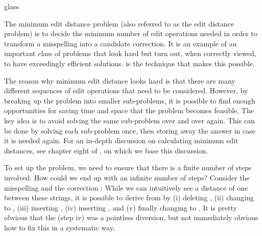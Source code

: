 
\begin{tblsfilledsymbol}{}{glass}
\begin{underthehood}

The minimum edit distance problem (also referred to as the edit distance problem) is to decide
the minimum number of edit operations needed in order to transform 
a misspelling into a candidate correction.
It is an example of an important class of problems
that look hard but turn out, when correctly viewed, to
have exceedingly efficient solutions. 
 is the technique that makes
this possible. 

The reason why minimum edit distance looks hard is that there are many different sequences of edit operations that need to be
considered. However, by breaking up the problem into smaller
sub-problems, it is possible to find enough opportunities for saving
time and space that the problem becomes feasible. The key idea is
to avoid solving the same sub-problem over and over again. This
can be done by solving each sub-problem once, then storing away the
answer in case it is needed again.
For an in-depth discussion on calculating minimum edit
distances, see chapter eight of \citet{mitton:96}, on which we base
this discussion.

To set up the problem, we need to ensure that there is a finite number
of steps involved. 
How could we end up with an infinite number of
steps?  
Consider the misspelling  and the correction : While we can intuitively see a distance of one between these strings,  it is possible to derive  from  by 
(i) deleting , (ii) changing  to , (iii) inserting , (iv) inserting , and (v) finally changing  to .  It is pretty obvious that the  (step iv) was a pointless diversion, but not immediately obvious how to fix this in a systematic way.


\end{underthehood}
\end{tblsfilledsymbol}
